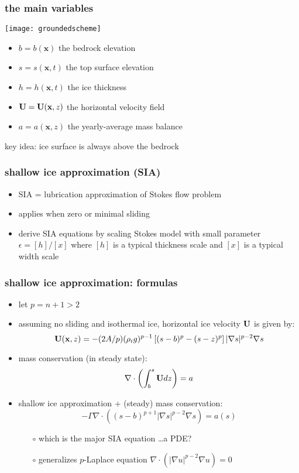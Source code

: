 \documentclass{beamer}
\newcommand{\bx}{\mathbf{x}}
\newcommand{\Div}{\nabla\cdot}
\newcommand{\eps}{\epsilon}
\begin{document}
\begin{frame}
  \frametitle{the main variables}

\begin{center}
\texttt{[image: groundedscheme]}
\end{center}

\begin{itemize}
\item $b=b(\bx)$ the bedrock elevation
\item $s=s(\bx,t)$ the top surface elevation
\item $h=h(\bx,t)$ the ice thickness
\item ${\bf U}={\bf U}(\bx,z)$ the horizontal velocity field
\item $a=a(\bx,z)$ the yearly-average mass balance
\end{itemize}

\begin{alertblock}{key idea: \alert{ice surface is always above the bedrock}}
\end{alertblock}
\end{frame}


\begin{frame}
  \frametitle{shallow ice approximation (SIA)}

\begin{itemize}
\item SIA = lubrication approximation of Stokes flow problem
\item applies when zero or minimal sliding
\item derive SIA equations by scaling Stokes model with small parameter $\eps = [h] / [x]$ where $[h]$ is a typical thickness scale and $[x]$ is a typical width scale
\end{itemize}
\end{frame}

  
\begin{frame}
  \frametitle{shallow ice approximation: formulas}
 
\begin{itemize}
\item let $p=n+1>2$
\item assuming no sliding and isothermal ice, horizontal ice velocity ${\bf U}$ is given by: 
  $${\bf U}(\bx,z)  =  - (2A/p) (\rho_i g)^{p-1}  \left[ (s-b)^p - (s - z)^p  \right] 
|\nabla s |^{p-2} \nabla s$$
\item mass conservation (in steady state): 
  $$\Div \left(  \int_b^s {\bf U} dz \right)  =  a$$
\item shallow ice approximation + (steady) mass conservation:
  $$- \Gamma  \Div \left( (s-b)^{p+1} | \nabla s |^{p-2} \nabla s  \right) =  a(s)$$
  \begin{itemize}
  \vspace{-0.2in}
  \item[$\circ$] which is the major SIA equation \dots a PDE?
  \item[$\circ$] generalizes $p$-Laplace equation $\Div \left( | \nabla u |^{p-2} \nabla u  \right) =  0$
  \end{itemize}
\end{itemize}
\end{frame}
\end{document}
